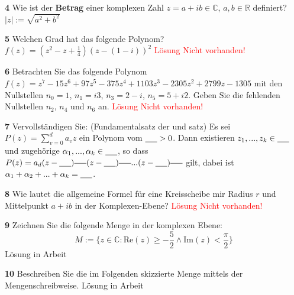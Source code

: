 \documentclass[11pt]{article}
\begin{document}
    \textbf{4} Wie ist der \textbf{Betrag} einer komplexen Zahl \( z = a + ib \in \mathbb{C} \), \( a,b \in \mathbb{R} \) definiert?\newline
    $\rvert z\rvert := \sqrt{a^2 + b^2}$\newline

    \textbf{5} Welchen Grad hat das folgende Polynom? \(f(z) = (z^2 - z + \frac{1}{4})(z - (1 - i))^2\)\newline
    \textcolor{red}{Lösung Nicht vorhanden!}\newline

    \textbf{6} Betrachten Sie das folgende Polynom \(f(z) = z^7 - 15z^6 + 97z^5 - 375z^4 + 1103z^3 - 2305z^2 + 2799z - 1305\) mit den Nullstellen \(n_0 = 1\), \(n_1 = i3\), \(n_3 = 2 - i\), \(n_5 = 5 + i2\). Geben Sie die fehlenden Nullstellen \(n_2\), \(n_4\) und \(n_6\) an.\newline
    \textcolor{red}{Lösung Nicht vorhanden!}\newline

    \textbf{7} Vervollständigen Sie:
    (Fundamentalsatz der \underline{\hspace{2cm}} und \underline{\hspace{2cm}} satz) Es sei
    \( P(z) = \sum_{v=0}^{d} a_v z \)
    ein Polynom vom \( \underline{\hspace{0.5cm}} > 0 \). Dann existieren \( z_1, ..., z_k \in \underline{\hspace{0.5cm}} \) und zugehörige \( \alpha_1, ..., \alpha_k \in \underline{\hspace{0.5cm}} \), so dass
    \( P(z) = a_d (z-\underline{\hspace{0.5cm}})^{\underline{\hspace{0.5cm}}} (z-\underline{\hspace{0.5cm}})^{\underline{\hspace{0.5cm}}} ... (z-\underline{\hspace{0.5cm}})^{\underline{\hspace{0.5cm}}} \)
    gilt, dabei ist \( \alpha_1 + \alpha_2 + ... + \alpha_k = \underline{\hspace{0.5cm}} \).\newline

    \textbf{8} Wie lautet die allgemeine Formel für eine Kreisscheibe mir Radius $r$ und Mittelpunkt $a + ib$ in der Komplexen-Ebene?\newline
    \textcolor{red}{Lösung Nicht vorhanden!}\newline

    \textbf{9} Zeichnen Sie die folgende Menge in der komplexen Ebene:
    \[ M := \{ z \in \mathbb{C} : \text{Re}(z) \geq -\frac{5}{2} \land \text{Im}(z) < \frac{\pi}{2} \} \]\newline
    Lösung in Arbeit\newline

    \textbf{10} Beschreiben Sie die im Folgenden skizzierte Menge mittels der Mengenschreibweise.\newline
    Lösung in Arbeit\newline
\end{document}
